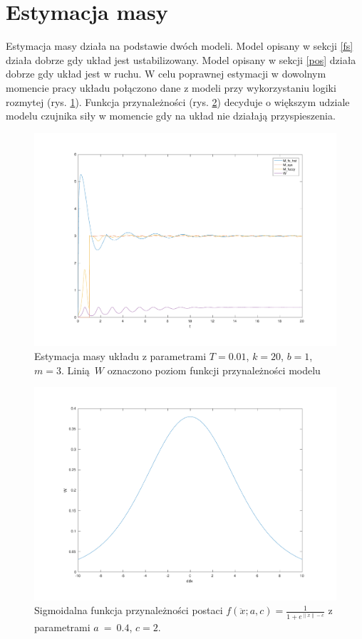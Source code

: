 \documentclass[a4paper]{article}
\begin{document}
\section{Estymacja masy}
Estymacja masy działa na podstawie dwóch modeli. Model opisany w sekcji \ref{fs} działa dobrze gdy układ jest ustabilizowany. Model opisany w sekcji \ref{pos} działa dobrze gdy układ jest w ruchu. W celu poprawnej estymacji w dowolnym momencie pracy układu połączono dane z modeli przy wykorzystaniu logiki rozmytej (rys. \ref{fig:system_mass}). Funkcja przynależności (rys. \ref{fig:system_w}) decyduje o większym udziale modelu czujnika siły w momencie gdy na układ nie działają przyspieszenia.

\begin{figure}[H]
	\includegraphics[width=0.99\linewidth]{system_mass}
	\centering
	\caption{Estymacja masy układu z parametrami $T=0.01$, $k = 20$, $b = 1$, $m = 3$. Linią $W$ oznaczono poziom funkcji przynależności modelu }
	\label{fig:system_mass}
\end{figure}

\begin{figure}[H]
	\includegraphics[width=0.99\linewidth]{system_w}
	\centering
	\caption{Sigmoidalna funkcja przynależności postaci $f(\ddot{x}; a, c) = \frac{1}{1+e^{\|\ddot{x}\|-c}}$ z parametrami $a~=~0.4$, $c = 2$.}
	\label{fig:system_w}
\end{figure}
\end{document}
